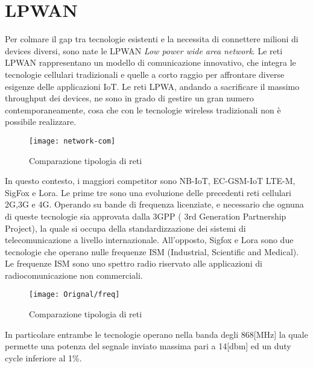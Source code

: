 \section{LPWAN}
Per colmare il gap tra tecnologie esistenti e la
necessita di connettere milioni di devices diversi, sono nate le  LPWAN
\emph{Low power wide area network}.
Le reti LPWAN rappresentano un modello  di comunicazione
innovativo, che integra le tecnologie cellulari tradizionali e quelle a corto
raggio per affrontare diverse esigenze delle applicazioni IoT. 
Le reti LPWA, andando a sacrificare il massimo throughput dei devices, ne sono in
grado di gestire un gran numero contemporaneamente, cosa che con le tecnologie
wireless tradizionali non è possibile realizzare.%

\begin{figure}[h]
    \centering 
        \texttt{[image: network-com]}
    \caption{Comparazione tipologia di reti}
\end{figure}

In questo contesto, i maggiori competitor sono  NB-IoT, EC-GSM-IoT
LTE-M, SigFox e Lora. Le prime tre  sono una evoluzione delle precedenti reti
cellulari 2G,3G e 4G. Operando su bande di frequenza licenziate, e necessario
che ognuna di queste tecnologie sia approvata dalla 3GPP ( 3rd Generation
Partnership Project), la quale si occupa della standardizzazione dei sistemi di
telecomunicazione a livello internazionale.
All'opposto, Sigfox e Lora sono due tecnologie che operano nulle frequenze ISM
(Industrial, Scientific and Medical). Le frequenze ISM sono uno spettro radio
riservato alle applicazioni di radiocomunicazione non commerciali.

\begin{figure}[h]
    \centering 
        \texttt{[image: Orignal/freq]}
    \caption{Comparazione tipologia di reti}
\end{figure}

In particolare entrambe le tecnologie operano  nella banda degli 868[MHz]
la quale permette una potenza del segnale inviato massima pari a 14[dbm] ed un
duty cycle inferiore al 1\%.%
 
